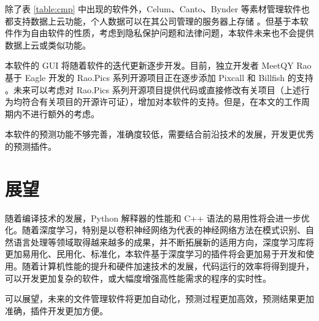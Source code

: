 除了表 \ref{table:cmp} 中出现的软件外，Celum、Canto、Bynder 等素材管理软件也都支持数据上云功能，个人数据可以在其公司管理的服务器上存储 \cite{celum} \cite{canto} \cite{bynder}。但基于本软件作为自由软件的性质，考虑到隐私保护问题和法律问题，本软件未来也不会提供数据上云或类似功能。

本软件的 GUI 将随着软件的迭代更新逐步开发。目前，独立开发者 MeetQY Rao 基于 Eagle 开发的 Rao.Pics 系列开源项目正在逐步添加 Pixcall 和 Billfish 的支持 \cite{rao}。未来可以考虑对 Rao.Pics 系列开源项目提供代码或直接修改有关项目（上述行为均符合有关项目的开源许可证），增加对本软件的支持。但是，在本文的工作周期内不进行额外的考虑。

本软件的预测功能不够完善，准确度较低，需要结合前沿技术的发展，开发更优秀的预测插件。

\section{展望}

随着编译技术的发展，Python 解释器的性能和 C++ 语法的易用性将会进一步优化。随着深度学习，特别是以卷积神经网络为代表的神经网络方法在模式识别、自然语言处理等领域取得越来越多的成果，并不断拓展新的适用方向，深度学习库将更加易用化、民用化、标准化，本软件基于深度学习的插件将会更加易于开发和使用。随着计算机性能的提升和硬件加速技术的发展，代码运行的效率将得到提升，可以开发更加复杂的软件，或大幅度增强高性能需求的程序的实时性。

可以展望，未来的文件管理软件将更加自动化，预测过程更加高效，预测结果更加准确，插件开发更加方便。
